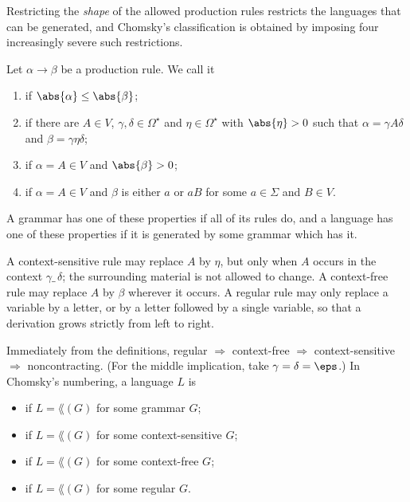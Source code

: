 Restricting the \emph{shape} of the allowed production rules restricts the languages that can be generated, and Chomsky's classification is obtained by imposing four increasingly severe such restrictions.

\begin{definition}
	Let $\alpha \to \beta$ be a production rule. We call it
	\begin{enumerate}[label=(\roman*)]
		\item {} if $\abs{\alpha} \leq \abs{\beta}$;
		\item {} if there are $A \in V$, $\gamma, \delta \in \Omega^\star$ and $\eta \in \Omega^\star$ with $\abs{\eta} > 0$ such that $\alpha = \gamma A \delta$ and $\beta = \gamma\eta\delta$;
		\item {} if $\alpha = A \in V$ and $\abs{\beta} > 0$;
		\item {} if $\alpha = A \in V$ and $\beta$ is either $a$ or $aB$ for some $a \in \Sigma$ and $B \in V$.
	\end{enumerate}
	A grammar has one of these properties if all of its rules do, and a language has one of these properties if it is generated by some grammar which has it.
\end{definition}

A context-sensitive rule may replace $A$ by $\eta$, but only when $A$ occurs in the context $\gamma \_\, \delta$; the surrounding material is not allowed to change. A context-free rule may replace $A$ by $\beta$ wherever it occurs. A regular rule may only replace a variable by a letter, or by a letter followed by a single variable, so that a derivation grows strictly from left to right.

Immediately from the definitions, regular $\Rightarrow$ context-free $\Rightarrow$ context-sensitive $\Rightarrow$ noncontracting. (For the middle implication, take $\gamma = \delta = \eps$.) In Chomsky's numbering, a language $L$ is
\begin{itemize}
	\item {} if $L = \lang(G)$ for some grammar $G$;
	\item {} if $L = \lang(G)$ for some context-sensitive $G$;
	\item {} if $L = \lang(G)$ for some context-free $G$;
	\item {} if $L = \lang(G)$ for some regular $G$.
\end{itemize}

